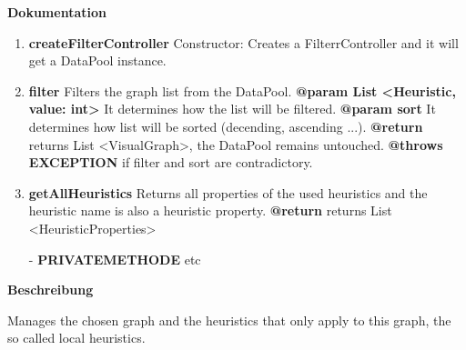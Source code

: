 \textbf{Dokumentation}
\begin{enumerate}[+]
	\item{
	\textbf{createFilterController} \newline
	Constructor: Creates a FilterrController and it will get a DataPool instance. \newline
}
	\item{
	\textbf{filter} \newline
	Filters the graph list from the DataPool. \newline
	\textbf{@param List <Heuristic, value: int>} It determines how the list will be filtered. \newline
	\textbf{@param sort} It determines how list will be sorted (decending, ascending ...). \newline
	\textbf{@return} returns List <VisualGraph>, the DataPool remains untouched. \newline
	\textbf{@throws EXCEPTION} if filter and sort are contradictory.\newline
}
	\item{
	\textbf{getAllHeuristics} \newline
	Returns all properties of the used heuristics and the heuristic name is also a heuristic property. \newline
	\textbf{@return} returns List <HeuristicProperties> \newline
}
	\item[-]{
		\textbf{PRIVATEMETHODE} etc
	}
\end{enumerate}

\textbf{Beschreibung}

Manages the chosen graph and the heuristics that only apply to this graph, the so called local heuristics. \newline

